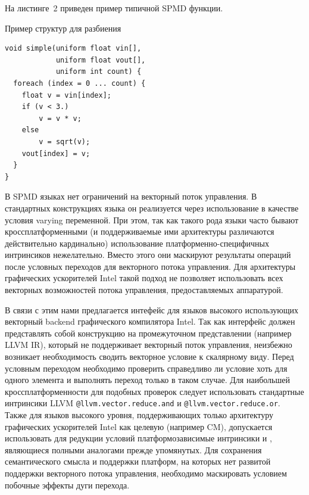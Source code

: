 На листинге~2 приведен пример типичной SPMD функции.

\begin{ListingEnv}[!h]
    \captiondelim{ } 
    \caption{Пример структур для разбиения}\label{lst:lowering/spmd-func}
    \begin{lstlisting}[language={[ISO]C++}]
void simple(uniform float vin[],
            uniform float vout[],
            uniform int count) {
  foreach (index = 0 ... count) {
    float v = vin[index];
    if (v < 3.)
        v = v * v;
    else
        v = sqrt(v);
    vout[index] = v;
  }
}
    \end{lstlisting}
\end{ListingEnv}

В SPMD языках нет ограничений на векторный поток управления. В стандартных конструкциях языка он реализуется через использование в качестве условия varying переменной. При этом, так как такого рода языки часто бывают кроссплатформенными (и поддерживаемые ими архитектуры различаются действительно кардинально) использование платформенно-специфичных интринсиков нежелательно. Вместо этого они маскируют результаты операций после условных переходов для векторного потока управления. Для архитектуры графических ускорителей Intel такой подход не позволяет использовать всех векторных возможностей потока управления, предоставляемых аппаратурой.

В связи с этим нами предлагается интефейс для языков высокого использующих векторный backend графического компилятора Intel. Так как интерфейс должен представлять собой конструкцию на промежуточном представлении (например LLVM IR), который не поддерживает векторный поток управления, неизбежно возникает необходимость сводить векторное условие к скалярному виду. Перед условным переходом необходимо проверить справедливо ли условие хоть для одного элемента и выполнять переход только в таком случае. Для наибольшей кроссплатформенности для подобных проверок следует использовать стандартные интринсики LLVM \texttt{@llvm.vector.reduce.and} и \texttt{@llvm.vector.reduce.or}. Также для языков высокого уровня, поддерживающих только архитектуру графических ускорителей Intel как целевую (например CM), допускается использовать для редукции условий платформозависимые интринсики  и , являющиеся полными аналогами прежде упомянутых. Для сохранения семантического смысла и поддержки платформ, на которых нет развитой поддержки векторного потока управления, необходимо маскировать условием побочные эффекты дуги перехода.

